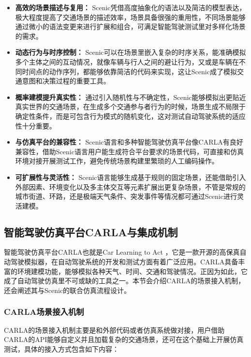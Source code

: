 \begin{itemize}
	\item \textbf{高效的场景描述与复用：} Scenic凭借高度抽象化的语法以及简洁的模型表达，极大程度提高了交通场景的描述效率，场景具备很强的重用性，不同场景能够通过微小的语法变更来进行扩展和组合，可满足智能驾驶测试里对多样化场景的需求。
	
	\item \textbf{动态行为与时序控制：} Scenic可以在场景里嵌入复杂的时序关系，能准确模拟多个主体之间的互动情况，就像车辆与行人之间的避让行为，又或是车辆在不同时间点的动作序列，都能够依靠简洁的代码来实现，这让Scenic成了模拟交通意图和决策过程的重要工具。
	
	\item \textbf{概率建模提升真实性：} 通过引入随机性与不确定性，Scenic能够模拟出更贴近真实世界的交通场景，在生成多个交通参与者行为的时候，场景生成不局限于确定性条件，而是可包含行为模式的随机变化，这对测试自动驾驶系统的适应性十分重要。
	
	\item \textbf{与仿真平台的兼容性：} Scenic语言和多种智能驾驶仿真平台像CARLA有良好兼容性，借助Scenic语言用户能生成符合平台要求的场景代码，可直接和仿真环境对接开展测试工作，避免传统场景构建里繁琐的人工编码操作。
	
	\item \textbf{可扩展性与灵活性：} Scenic语言能够生成基于规则的固定场景，还能借助引入外部因素、环境变化以及多主体交互等元素扩展出更复杂场景，不管是常规的城市街道、环路，还是极端天气条件、突发事件等情况都可通过Scenic进行灵活建模。
\end{itemize}
\subsection{智能驾驶仿真平台CARLA与集成机制}

智能驾驶仿真平台CARLA也就是Car Learning to Act ，它是一款开源的高保真自动驾驶模拟器，在自动驾驶系统的开发和测试方面有着广泛应用。CARLA具备丰富的环境建模功能，能够模拟各种天气、时间、交通和驾驶情况。正因为如此，它成了自动驾驶仿真里不可或缺的工具之一。本节会介绍CARLA的场景接入机制，还会阐述其与Scenic的联合仿真流程设计。
\subsubsection{CARLA场景接入机制}

CARLA的场景接入机制主要是和外部代码或者仿真系统做对接，用户借助CARLA的API能够自定义并且加载复杂的交通场景，还可在这个基础上开展仿真测试，具体的接入方式包含如下内容：

